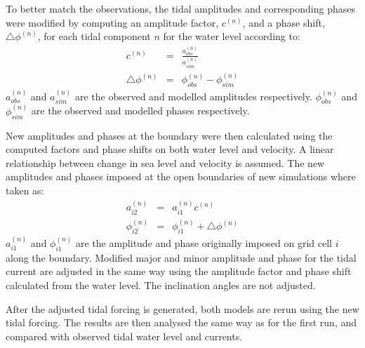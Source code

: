 To better match the observations, the tidal amplitudes and corresponding phases were modified by computing an amplitude factor, $c^{(n)}$, and a phase shift, $\triangle \phi^{(n)}$, for each tidal component $n$ for the water level according to:
\begin{eqnarray}
c^{(n)} &=& \frac{a^{(n)}_{obs}}{a^{(n)}_{sim}} \\
\triangle \phi^{(n)} &=& \phi^{(n)}_{obs} - \phi^{(n)}_{sim}
\end{eqnarray}
$a^{(n)}_{obs}$ and $a^{(n)}_{sim}$ are the observed and modelled amplitudes respectively. $\phi^{(n)}_{obs}$ and $\phi^{(n)}_{sim}$ are the observed and modelled phases respectively. 

New amplitudes and phases at the boundary were then calculated using the computed factors and phase shifts on both water level and velocity. A linear relationship between change in sea level and velocity is assumed. The new amplitudes and phases imposed at the open boundaries of new simulations where taken as:
\begin{eqnarray}
a^{(n)}_{i2} &=& a^{(n)}_{i1} c^{(n)} \\
\phi^{(n)}_{i2} &=& \phi^{(n)}_{i1} + \triangle \phi^{(n)}
\end{eqnarray}
$a^{(n)}_{i1}$ and $\phi^{(n)}_{i1}$ are the amplitude and phase originally imposed on grid cell $i$ along the boundary. Modified major and minor amplitude and phase for the tidal current are adjusted in the same way using the amplitude factor and phase shift calculated from the water level. The inclination angles are not adjusted.

After the adjusted tidal forcing is generated, both models are rerun using the new tidal forcing. The results are then analysed the same way as for the first run, and compared with observed tidal water level and currents. 

